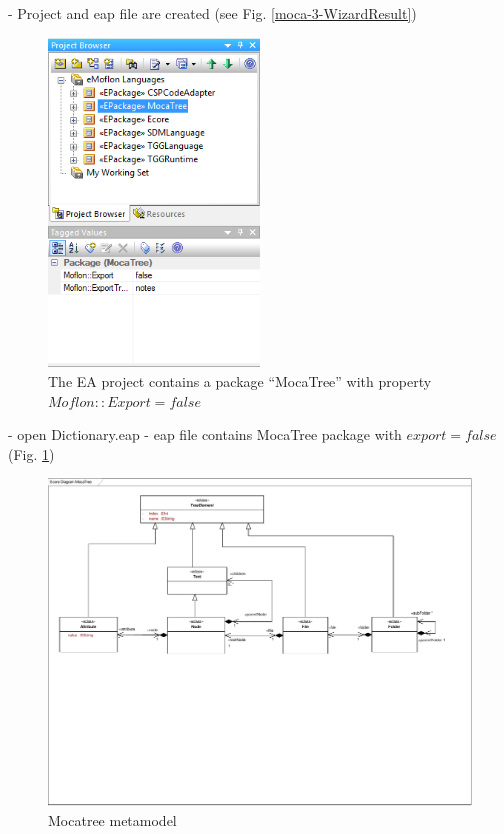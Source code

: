 - Project and eap file are created (see Fig. \ref{moca-3-WizardResult})

\begin{figure}[!htbp]
\begin{center}
 \includegraphics[width=0.5\textwidth]{pics/moca/1DictionaryMetaModel/4-eapContainsMocatreeWithExportFalse}
  \caption{The EA project contains a package ``MocaTree'' with property
  $Moflon::Export = false$}
  \label{moca-4-eapContainsMocatreeWithExportFalse}
\end{center}
\end{figure}

- open Dictionary.eap
- eap file contains MocaTree package with $export = false$ (Fig.
\ref{moca-4-eapContainsMocatreeWithExportFalse})

\begin{figure}[!htbp]
\begin{center}
 \includegraphics[width=\textwidth]{pics/moca/0Install/0-MocaTree}
  \caption{Mocatree metamodel}
  \label{moca-tree}
\end{center}
\end{figure}
 

